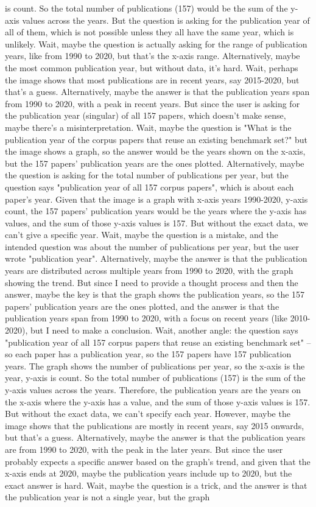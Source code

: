 is count. So the total number of publications (157) would be the sum of the y-axis values across the years. But the question is asking for the publication year of all of them, which is not possible unless they all have the same year, which is unlikely. Wait, maybe the question is actually asking for the range of publication years, like from 1990 to 2020, but that's the x-axis range. Alternatively, maybe the most common publication year, but without data, it's hard. Wait, perhaps the image shows that most publications are in recent years, say 2015-2020, but that's a guess. Alternatively, maybe the answer is that the publication years span from 1990 to 2020, with a peak in recent years. But since the user is asking for the publication year (singular) of all 157 papers, which doesn't make sense, maybe there's a misinterpretation. Wait, maybe the question is "What is the publication year of the corpus papers that reuse an existing benchmark set?" but the image shows a graph, so the answer would be the years shown on the x-axis, but the 157 papers' publication years are the ones plotted. Alternatively, maybe the question is asking for the total number of publications per year, but the question says "publication year of all 157 corpus papers", which is about each paper's year. Given that the image is a graph with x-axis years 1990-2020, y-axis count, the 157 papers' publication years would be the years where the y-axis has values, and the sum of those y-axis values is 157. But without the exact data, we can't give a specific year. Wait, maybe the question is a mistake, and the intended question was about the number of publications per year, but the user wrote "publication year". Alternatively, maybe the answer is that the publication years are distributed across multiple years from 1990 to 2020, with the graph showing the trend. But since I need to provide a thought process and then the answer, maybe the key is that the graph shows the publication years, so the 157 papers' publication years are the ones plotted, and the answer is that the publication years span from 1990 to 2020, with a focus on recent years (like 2010-2020), but I need to make a conclusion. Wait, another angle: the question says "publication year of all 157 corpus papers that reuse an existing benchmark set" – so each paper has a publication year, so the 157 papers have 157 publication years. The graph shows the number of publications per year, so the x-axis is the year, y-axis is count. So the total number of publications (157) is the sum of the y-axis values across the years. Therefore, the publication years are the years on the x-axis where the y-axis has a value, and the sum of those y-axis values is 157. But without the exact data, we can't specify each year. However, maybe the image shows that the publications are mostly in recent years, say 2015 onwards, but that's a guess. Alternatively, maybe the answer is that the publication years are from 1990 to 2020, with the peak in the later years. But since the user probably expects a specific answer based on the graph's trend, and given that the x-axis ends at 2020, maybe the publication years include up to 2020, but the exact answer is hard. Wait, maybe the question is a trick, and the answer is that the publication year is not a single year, but the graph 